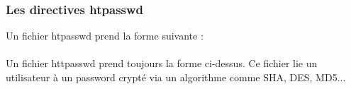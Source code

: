 \documentclass{article}
\begin{document}
\subsubsection{Les directives htpasswd}
\hspace*{0.6cm}Un fichier htpasswd prend la forme suivante :
\vspace{0.2cm}\\
\vspace{0.2cm}\\
\hspace*{0.6cm}Un fichier httpasswd prend toujours la forme ci-dessus. Ce fichier lie un utilisateur \`a un password crypt\'e via un algorithme comme SHA, DES, MD5...
\end{document}
